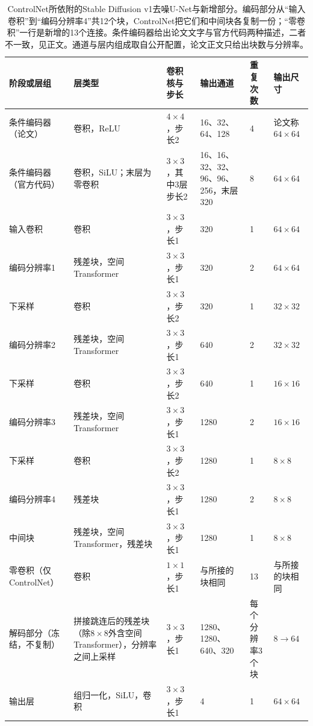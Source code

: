 \begin{table}[tbp]
 \centering
 \small
 \begin{tabularx}{\linewidth}{@{}p{30mm}Xp{24mm}p{22mm}p{12mm}p{20mm}@{}}
  \toprule
  阶段或层组 & 层类型 & 卷积核与步长 & 输出通道 & 重复次数 & 输出尺寸\\
  \midrule
  条件编码器（论文） & 卷积，ReLU & $4\times4$，步长2 & 16、32、64、128 & 4 & 论文称$64\times64$\\
  条件编码器（官方代码） & 卷积，SiLU；末层为零卷积 & $3\times3$，其中3层步长2 & 16、16、32、32、96、96、256，末层320 & 8 & $64\times64$\\
  输入卷积 & 卷积 & $3\times3$，步长1 & 320 & 1 & $64\times64$\\
  编码分辨率1 & 残差块，空间Transformer & $3\times3$，步长1 & 320 & 2 & $64\times64$\\
  下采样 & 卷积 & $3\times3$，步长2 & 320 & 1 & $32\times32$\\
  编码分辨率2 & 残差块，空间Transformer & $3\times3$，步长1 & 640 & 2 & $32\times32$\\
  下采样 & 卷积 & $3\times3$，步长2 & 640 & 1 & $16\times16$\\
  编码分辨率3 & 残差块，空间Transformer & $3\times3$，步长1 & 1280 & 2 & $16\times16$\\
  下采样 & 卷积 & $3\times3$，步长2 & 1280 & 1 & $8\times8$\\
  编码分辨率4 & 残差块 & $3\times3$，步长1 & 1280 & 2 & $8\times8$\\
  中间块 & 残差块，空间Transformer，残差块 & $3\times3$，步长1 & 1280 & 1 & $8\times8$\\
  零卷积（仅ControlNet） & 卷积 & $1\times1$，步长1 & 与所接的块相同 & 13 & 与所接的块相同\\
  解码部分（冻结，不复制） & 拼接跳连后的残差块（除$8\times8$外含空间Transformer），分辨率之间上采样 & $3\times3$，步长1 & 1280、1280、640、320 & 每个分辨率3个块 & $8\to64$\\
  输出层 & 组归一化，SiLU，卷积 & $3\times3$，步长1 & 4 & 1 & $64\times64$\\
  \bottomrule
 \end{tabularx}
 \caption{ControlNet所依附的Stable Diffusion v1去噪U-Net与新增部分。编码部分从“输入卷积”到“编码分辨率4”共12个块，ControlNet把它们和中间块各复制一份；“零卷积”一行是新增的13个连接。条件编码器给出论文文字与官方代码两种描述，二者不一致，见正文。通道与层内组成取自公开配置，论文正文只给出块数与分辨率。}
 \label{tab:vision-controlnet-structure}
\end{table}

